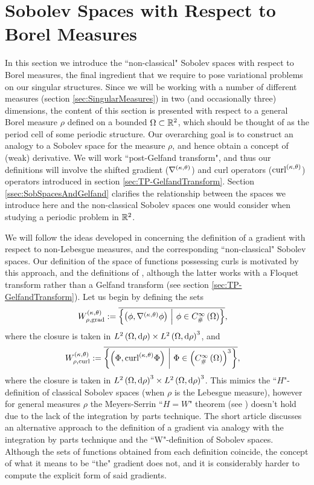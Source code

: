 \section{Sobolev Spaces with Respect to Borel Measures} \label{sec:BorelMeasSobSpaces}
In this section we introduce the ``non-classical" Sobolev spaces with respect to Borel measures, the final ingredient that we require to pose variational problems on our singular structures.
Since we will be working with a number of different measures (section \ref{sec:SingularMeasures}) in two  (and occasionally three) dimensions, the content of this section is presented with respect to a general Borel measure $\rho$ defined on a bounded $\Omega\subset\mathbb{R}^2$, which should be thought of as the period cell of some periodic structure.
Our overarching goal is to construct an analogy to a Sobolev space for the measure $\rho$, and hence obtain a concept of (weak) derivative.
We will work ``post-Gelfand transform", and thus our definitions will involve the shifted gradient ($\nabla^{\left( \kappa, \theta \right)}$) and curl operators ($\mathrm{curl}_{}^{\left( \kappa, \theta \right)}$) operators introduced in section \ref{sec:TP-GelfandTransform}.
Section \ref{ssec:SobSpacesAndGelfand} clarifies the relationship between the spaces we introduce here and the non-classical Sobolev spaces one would consider when studying a periodic problem in $\mathbb{R}^2$.

We will follow the ideas developed in \cite{zhikov2000extension, zhikov2002homogenization} concerning the definition of a gradient with respect to non-Lebesgue measures, and the corresponding ``non-classical" Sobolev spaces.
Our definition of the space of functions possessing curls is motivated by this approach, and the definitions of \cite{cherednichenko2022operator, cherednichenko2020order}, although the latter works with a Floquet transform rather than a Gelfand transform (see section \ref{sec:TP-GelfandTransform}).
Let us begin by defining the sets
\begin{align*}
	W^{\left( \kappa, \theta \right)}_{\rho,\mathrm{grad}} &:= \overline{\left\{  \left( \phi, \nabla^{\left( \kappa, \theta \right)}\phi \right) \ \middle\vert \  \phi\in C^{\infty}_{\#}\left( \Omega \right)  \right\}},
\end{align*}
where the closure is taken in $L^{2}\left( \Omega,\mathrm{d} \rho \right)\times L^{2}\left( \Omega,\mathrm{d} \rho \right)^3$, and 
\begin{align*}
	W^{\left( \kappa, \theta \right)}_{\rho,\mathrm{curl}} &:= \overline{\left\{  \left( \Phi, \mathrm{curl}_{}^{\left( \kappa, \theta \right)}\Phi \right) \ \middle\vert \  \Phi\in\left( C^{\infty}_{\#}\left( \Omega \right) \right)^3  \right\}},
\end{align*}
where the closure is taken in $L^{2}\left( \Omega,\mathrm{d} \rho \right)^3\times L^{2}\left( \Omega,\mathrm{d} \rho \right)^3$.
This mimics the ``$H$"-definition of classical Sobolev spaces (when $\rho$ is the Lebesgue measure), however for general measures $\rho$ the Meyers-Serrin ``$H=W$" theorem (see \cite[Theorem 3.17]{adams2003sobolev}) doesn't hold due to the lack of the integration by parts technique.
The short article \cite{zhikov2005note} discusses an alternative approach to the definition of a gradient via analogy with the integration by parts technique and the ``W"-definition of Sobolev spaces.
Although the sets of functions obtained from each definition coincide, the concept of what it means to be ``the" gradient does not, and it is considerably harder to compute the explicit form of said gradients.


